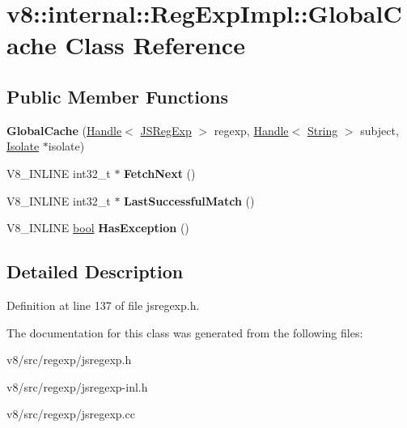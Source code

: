 \hypertarget{classv8_1_1internal_1_1RegExpImpl_1_1GlobalCache}{}\section{v8\+:\+:internal\+:\+:Reg\+Exp\+Impl\+:\+:Global\+Cache Class Reference}
\label{classv8_1_1internal_1_1RegExpImpl_1_1GlobalCache}
\subsection*{Public Member Functions}
\begin{DoxyCompactItemize}
\item 
\mbox{\label{classv8_1_1internal_1_1RegExpImpl_1_1GlobalCache_a68112a559c6aa3991941c11353938140}} 
{\bfseries Global\+Cache} (\mbox{\hyperlink{classv8_1_1internal_1_1Handle}{Handle}}$<$ \mbox{\hyperlink{classv8_1_1internal_1_1JSRegExp}{J\+S\+Reg\+Exp}} $>$ regexp, \mbox{\hyperlink{classv8_1_1internal_1_1Handle}{Handle}}$<$ \mbox{\hyperlink{classv8_1_1internal_1_1String}{String}} $>$ subject, \mbox{\hyperlink{classv8_1_1internal_1_1Isolate}{Isolate}} $\ast$isolate)
\item 
\mbox{\label{classv8_1_1internal_1_1RegExpImpl_1_1GlobalCache_a459b57717703ce85d35b79c520afbf31}} 
V8\+\_\+\+I\+N\+L\+I\+NE int32\+\_\+t $\ast$ {\bfseries Fetch\+Next} ()
\item 
\mbox{\label{classv8_1_1internal_1_1RegExpImpl_1_1GlobalCache_a28e5b4e063b4003f2f920f29899ffb59}} 
V8\+\_\+\+I\+N\+L\+I\+NE int32\+\_\+t $\ast$ {\bfseries Last\+Successful\+Match} ()
\item 
\mbox{\label{classv8_1_1internal_1_1RegExpImpl_1_1GlobalCache_a5a13ced3e2d3a837f87f1950a0743bc2}} 
V8\+\_\+\+I\+N\+L\+I\+NE \mbox{\hyperlink{classbool}{bool}} {\bfseries Has\+Exception} ()
\end{DoxyCompactItemize}


\subsection{Detailed Description}


Definition at line 137 of file jsregexp.\+h.



The documentation for this class was generated from the following files\+:\begin{DoxyCompactItemize}
\item 
v8/src/regexp/jsregexp.\+h\item 
v8/src/regexp/jsregexp-\/inl.\+h\item 
v8/src/regexp/jsregexp.\+cc\end{DoxyCompactItemize}

